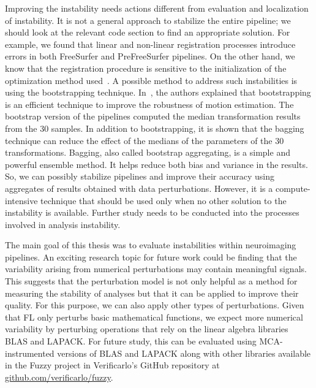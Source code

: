 Improving the instability needs actions different from evaluation and localization of instability.
It is not a general approach to stabilize the entire pipeline; we should look at the relevant code section
to find an appropriate solution. For example, we found that linear and non-linear registration processes introduce errors
in both FreeSurfer and PreFreeSurfer pipelines. On the other hand, we know that the registration procedure is sensitive to
the initialization of the optimization method used~\cite{Glatard2018hbm}. 
A possible method to address such instabilities is using the bootstrapping technique.
In~\cite{Glatard2018hbm}, the authors explained that bootstrapping is an efficient technique to improve
the robustness of motion estimation. The bootstrap version of the pipelines computed the median transformation
results from the 30 samples. In addition to bootstrapping, it is shown that the bagging technique can
reduce the effect of the medians of the parameters of the 30 transformations. Bagging, also called bootstrap
aggregating, is a simple and powerful ensemble method. It helps reduce both bias and variance in the results.
So, we can possibly stabilize pipelines and improve their accuracy using aggregates of results obtained with
data perturbations. However, it is a compute-intensive technique that should be used only when no other
solution to the instability is available. 
Further study needs to be conducted into the processes involved in analysis instability.

The main goal of this thesis was to evaluate instabilities within neuroimaging pipelines. 
An exciting research topic for future work could be finding that the variability arising from numerical perturbations may contain
meaningful signals. This suggests that the perturbation model is not only helpful as a method for measuring
the stability of analyses but that it can be applied to improve their quality. 
For this purpose, we can also apply other types of perturbations.
Given that FL only perturbs basic mathematical functions, we expect more numerical variability
by perturbing operations that rely on the linear algebra libraries BLAS and LAPACK.
For future study, this can be evaluated using MCA-instrumented
versions of BLAS and LAPACK along with other libraries available in the Fuzzy project in Verificarlo’s
GitHub repository at \url{github.com/verificarlo/fuzzy}.

